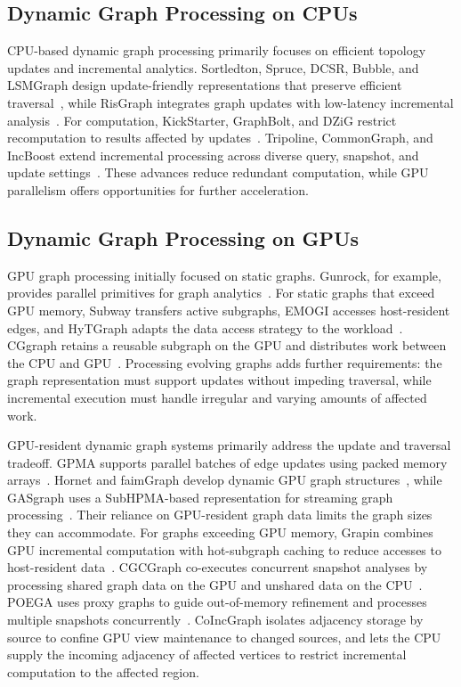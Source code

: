 \subsection{Dynamic Graph Processing on CPUs}

CPU-based dynamic graph processing primarily focuses on efficient topology updates and incremental analytics. Sortledton, Spruce, DCSR, Bubble, and LSMGraph design update-friendly representations that preserve efficient traversal~\cite{2022-Sortledton,2024-Spruce,2025-DCSR,2025-Bubble,2024-LSMGraph}, while RisGraph integrates graph updates with low-latency incremental analysis~\cite{2021-RisGraph}. For computation, KickStarter, GraphBolt, and DZiG restrict recomputation to results affected by updates~\cite{2017-KickStarter,2019-GraphBolt,2021-DZiG}. Tripoline, CommonGraph, and IncBoost extend incremental processing across diverse query, snapshot, and update settings~\cite{2021-Tripoline,2023-CommonGraph,2024-IncBoost}. These advances reduce redundant computation, while GPU parallelism offers opportunities for further acceleration.

\subsection{Dynamic Graph Processing on GPUs}

GPU graph processing initially focused on static graphs. Gunrock, for example, provides parallel primitives for graph
analytics~\cite{2016-Gunrock}. For static graphs that exceed GPU memory, Subway transfers active subgraphs, EMOGI accesses host-resident edges, and HyTGraph adapts the data access strategy to the workload~\cite{2020-Subway,2020-EMOGI,2023-HyTGraph}. CGgraph retains a reusable subgraph on the GPU and distributes work between the CPU and GPU~\cite{2024-CGgraph}. Processing evolving graphs adds further requirements: the graph representation must support
updates without impeding traversal, while incremental execution must handle irregular and varying amounts of affected work.

GPU-resident dynamic graph systems primarily address the update and traversal tradeoff. GPMA supports parallel batches of edge updates using packed memory arrays~\cite{2017-GPMA}. Hornet and faimGraph develop dynamic GPU graph structures~\cite{2018-Hornet, 2018-faimGraph}, while GASgraph uses a SubHPMA-based representation for streaming graph
processing~\cite{2025-GASgraph}. Their reliance on GPU-resident graph data limits the graph sizes they can accommodate. For graphs exceeding GPU memory, Grapin combines GPU incremental computation with hot-subgraph caching to reduce accesses to host-resident data~\cite{2025-Grapin}. CGCGraph co-executes concurrent snapshot analyses by processing shared graph data on the GPU and unshared data on the CPU~\cite{2025-CGCGraph}. POEGA uses proxy graphs to guide out-of-memory refinement and processes multiple snapshots concurrently~\cite{2026-POEGA}. CoIncGraph isolates adjacency storage by source to confine GPU view maintenance to changed sources, and lets the CPU supply the incoming adjacency of affected vertices to restrict incremental computation to the affected region.

